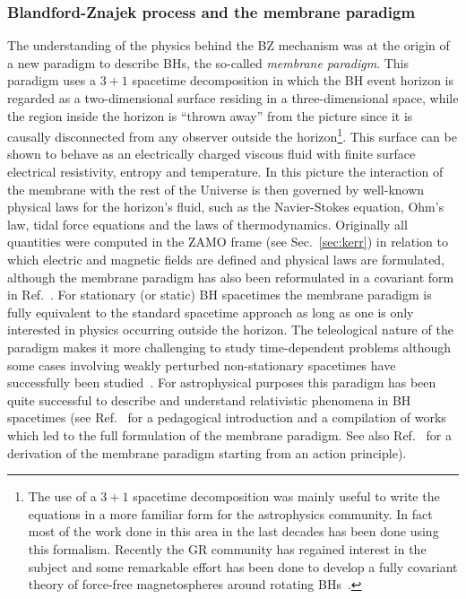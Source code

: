 \documentclass[11pt]{article}
\numberwithin{equation}{section} %
\begin{document}
\subsubsection{Blandford-Znajek process and the membrane paradigm}

The understanding of the physics behind the BZ mechanism was at the origin of a new paradigm to describe BHs, the 
so-called \emph{membrane paradigm}. This paradigm uses a $3+1$ spacetime decomposition in which the BH event horizon is 
regarded as a two-dimensional surface residing in a three-dimensional space, while the region inside the horizon is 
``thrown away'' from the picture since it is causally disconnected from any observer outside the horizon\footnote{The 
use of a $3+1$ spacetime decomposition was mainly useful to write the equations in a more familiar form for the 
astrophysics community. In fact most of the work done in this area in the last decades has been done using this 
formalism. Recently the GR community has regained interest in the subject and some remarkable effort has been done to 
develop a fully covariant theory of force-free magnetospheres around rotating BHs~\cite{Gralla:2014yja}.}. This surface 
can be shown to behave as an electrically charged viscous fluid with finite surface electrical resistivity, entropy and 
temperature. In this picture the interaction of the membrane with the rest of the Universe is then governed by 
well-known physical laws for the horizon's fluid, such as the Navier-Stokes equation, Ohm's law, tidal force equations 
and the laws of thermodynamics. Originally all quantities were computed in the ZAMO frame (see Sec.~\ref{sec:kerr}) in 
relation to which electric and magnetic fields are defined and physical laws are formulated, although the membrane 
paradigm has also been reformulated in a covariant form in Ref.~\cite{Parikh:1997ma}. For stationary (or static) BH 
spacetimes the membrane paradigm is fully equivalent to the standard spacetime approach as long as one is only 
interested in physics occurring outside the horizon. The teleological nature of the paradigm makes it more challenging 
to study time-dependent problems although some cases involving weakly perturbed non-stationary spacetimes have 
successfully been studied~\cite{MembraneParadigm}. For astrophysical purposes this paradigm has been quite successful to 
describe and understand relativistic phenomena in BH spacetimes (see Ref.~\cite{MembraneParadigm} for a pedagogical 
introduction and a compilation of works which led to the full formulation of the membrane paradigm. See also 
Ref.~\cite{Parikh:1997ma} for a derivation of the membrane paradigm starting from an action principle).
\end{document}
